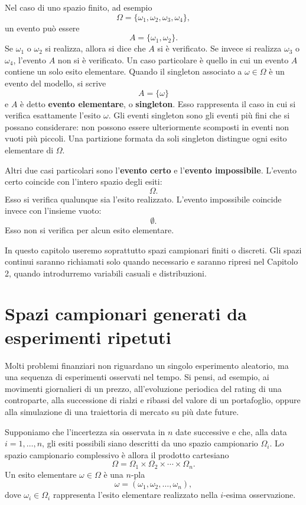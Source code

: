 Nel caso di uno spazio finito, ad esempio
\[
\Omega=\{\omega_{1},\omega_{2},\omega_{3},\omega_{4}\},
\]
un evento pu\`{o} essere
\[
A=\{\omega_{1},\omega_{2}\}.
\]
Se $\omega_{1}$ o $\omega_{2}$ si realizza, allora si dice che $A$ si \`{e}
verificato. Se invece si realizza $\omega_{3}$ o $\omega_{4}$, l'evento $A$
non si \`{e} verificato. 
Un caso particolare \`{e} quello in cui un evento $A$ contiene un solo esito
elementare. Quando il singleton associato a $\omega\in\Omega$ \`{e} un evento
del modello, si scrive
\[
A=\{\omega\}
\]
e $A$ \`{e} detto \textbf{evento elementare}, o \textbf{singleton}. Esso rappresenta il caso in
cui si verifica esattamente l'esito $\omega$. Gli eventi singleton sono gli eventi pi\`{u} fini che si possano considerare:
non possono essere ulteriormente scomposti in eventi non vuoti pi\`{u} piccoli.
Una partizione formata da soli singleton distingue ogni esito elementare di
$\Omega$.

Altri due casi particolari sono l'\textbf{evento certo} e l'\textbf{evento impossibile}. 
L'evento certo coincide con l'intero spazio degli esiti:
\[
\Omega.
\]
Esso si verifica qualunque sia l'esito realizzato. L'evento impossibile coincide
invece con l'insieme vuoto:
\[
\emptyset.
\]
Esso non si verifica per alcun esito elementare.

In questo capitolo useremo soprattutto spazi campionari finiti o discreti. Gli
spazi continui saranno richiamati solo quando necessario e saranno ripresi nel
Capitolo 2, quando introdurremo variabili casuali e distribuzioni.

\section{Spazi campionari generati da esperimenti ripetuti}

Molti problemi finanziari non riguardano un singolo esperimento aleatorio, ma
una sequenza di esperimenti osservati nel tempo. Si pensi, ad esempio, ai
movimenti giornalieri di un prezzo, all'evoluzione periodica del rating di una
controparte, alla successione di rialzi e ribassi del valore di un
portafoglio, oppure alla simulazione di una traiettoria di mercato su pi\`{u}
date future.

Supponiamo che l'incertezza sia osservata in $n$ date successive e che, alla
data $i=1,\ldots,n$, gli esiti possibili siano descritti da uno spazio
campionario $\Omega_{i}$. Lo spazio campionario complessivo \`{e} allora il
prodotto cartesiano
\[
\Omega=\Omega_{1}\times\Omega_{2}\times\cdots\times\Omega_{n}.
\]
Un esito elementare $\omega\in\Omega$ \`{e} una $n$-pla
\[
\omega=(\omega_{1},\omega_{2},\ldots,\omega_{n}),
\]
dove $\omega_{i}\in\Omega_{i}$ rappresenta l'esito elementare realizzato nella
$i$-esima osservazione.

